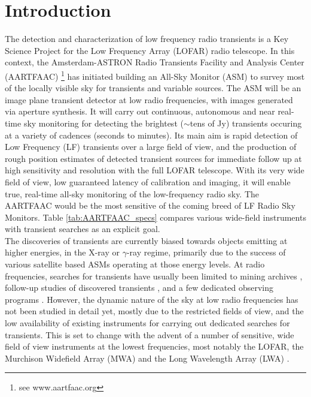\documentclass{aa}
\begin{document}

\maketitle

\section{\label{sec:Introduction}Introduction}
The detection  and characterization of low  frequency radio transients  is a Key
Science  Project \citep{fender2006lofar}  for  the Low  Frequency Array  (LOFAR)
\citep{vanhaarlem2013lofar}   radio    telescope.    In   this    context,   the
Amsterdam-ASTRON    Radio    Transients    Facility    and    Analysis    Center
(AARTFAAC) \footnote{see  www.aartfaac.org }  has initiated building  an All-Sky
Monitor  (ASM) to  survey most  of the  locally visible  sky for  transients and
variable sources.   The ASM  will be  an image plane  transient detector  at low
radio frequencies, with images generated  via aperture synthesis.  It will carry
out continuous, autonomous  and near real-time sky monitoring  for detecting the
brightest  ($\sim$tens  of Jy)  transients  occuring  at  a variety  of  cadences
(seconds to  minutes). Its  main aim  is rapid detection  of Low  Frequency (LF)
transients over  a large  field of  view, and the  production of  rough position
estimates  of  detected  transient  sources  for immediate  follow  up  at  high
sensitivity and  resolution with  the full LOFAR  telescope. With its  very wide
field of view, low guaranteed latency of calibration and imaging, it will enable
true, real-time all-sky monitoring of  the low-frequency radio sky. The AARTFAAC
would be the most sensitive of the coming breed of LF Radio Sky Monitors.  Table
\ref{tab:AARTFAAC_specs} compares various  wide-field instruments with transient
searches as an explicit goal.\\

The discoveries of  transients are currently biased towards  objects emitting at
higher  energies, in  the X-ray  or $\gamma$-ray  regime, primarily  due  to the
success of  various satellite  based ASMs operating  at those energy  levels. At
radio frequencies, searches  for transients have usually been  limited to mining
archives  \citep{bower2007submillijansky, bower2011search}, follow-up  studies of
discovered  transients \citep{chandra2012radio}, and  a few  dedicated observing
programs  \citep{bannister2012limits,  katz2003survey}.  However,  the  dynamic
nature of the sky  at low radio frequencies has not been  studied in detail yet,
mostly  due to  the  restricted fields  of  view, and  the  low availability  of
existing instruments  for carrying out dedicated searches  for transients.  This
is set to  change with the advent of  a number of sensitive, wide  field of view
instruments at  the lowest  frequencies, most notably  the LOFAR,  the Murchison
Widefield  Array  (MWA) \citep{lonsdale2009murchison}  and  the Long  Wavelength
Array (LWA) \citep{ellingson2009long}.
\end{document}
